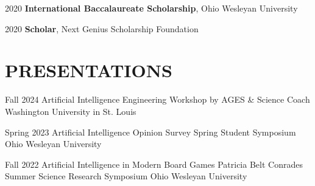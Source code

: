 \documentclass[10pt, letterpaper]{article}
\begin{document}
\begin{honorentry}
  {2020} %
  {\textbf{International Baccalaureate Scholarship}, Ohio Wesleyan University} %
\end{honorentry}

\begin{honorentry}
  {2020} %
  {\textbf{Scholar}, Next Genius Scholarship Foundation} %
\end{honorentry}

\vspace{\headerSpacing}

\section{PRESENTATIONS}

\begin{presentationentry}
  {Fall 2024} %
  {Artificial Intelligence} %
  {Engineering Workshop by AGES \& Science Coach} %
  {Washington University in St. Louis} %
\end{presentationentry}

\begin{presentationentry}
  {Spring 2023} %
  {Artificial Intelligence Opinion Survey} %
  {Spring Student Symposium} %
  {Ohio Wesleyan University} %
\end{presentationentry}

\begin{presentationentry}
  {Fall 2022} %
  {Artificial Intelligence in Modern Board Games} %
  {Patricia Belt Conrades Summer Science Research Symposium} %
  {Ohio Wesleyan University} %
\end{presentationentry}

\vspace{\headerSpacing}
\end{document}
